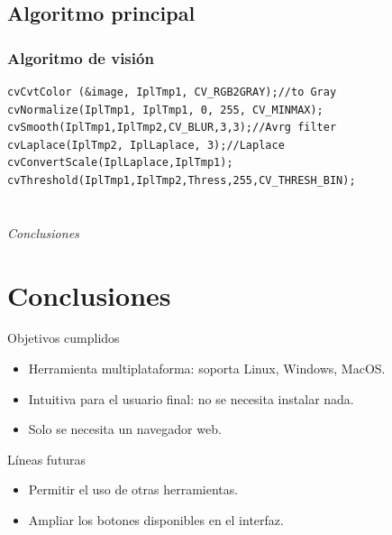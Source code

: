 \documentclass{beamer}
\begin{document}
\subsection{Algoritmo principal}
\begin{frame}[fragile]
\frametitle{Algoritmo de visión}
\begin{lstlisting}
cvCvtColor (&image, IplTmp1, CV_RGB2GRAY);//to Gray
cvNormalize(IplTmp1, IplTmp1, 0, 255, CV_MINMAX);
cvSmooth(IplTmp1,IplTmp2,CV_BLUR,3,3);//Avrg filter
cvLaplace(IplTmp2, IplLaplace, 3);//Laplace
cvConvertScale(IplLaplace,IplTmp1);
cvThreshold(IplTmp1,IplTmp2,Thress,255,CV_THRESH_BIN);
\end{lstlisting}
\end{frame}

\section*{}
\begin{frame}{}
  \centering \Huge
  \emph{Conclusiones}
\end{frame}

\section{Conclusiones}
\begin{frame}
\begin{block}{Objetivos cumplidos}
\begin{itemize}
\item Herramienta multiplataforma: soporta Linux, Windows, MacOS.
\item Intuitiva para el usuario final: no se necesita instalar nada.
\item Solo se necesita un navegador web.
\end{itemize}
\end{block}

\begin{block}{Líneas futuras}
\begin{itemize}
\item Permitir el uso de otras herramientas.
\item Ampliar los botones disponibles en el interfaz.
\end{itemize}
\end{block}
\end{frame}

\begin{frame}[plain]
\large{\titlepage}
\end{frame}
\end{document}

